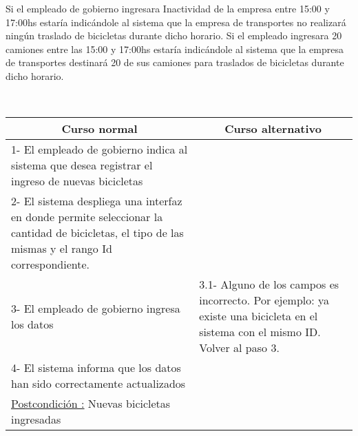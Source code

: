 Si el empleado de gobierno ingresara Inactividad de la empresa entre 15:00 y 17:00hs estaría indicándole al sistema que la empresa de transportes no realizará ningún
traslado de bicicletas durante dicho horario.
Si el empleado ingresara 20 camiones entre las 15:00 y 17:00hs estaría indicándole al sistema que la empresa de transportes destinará 20 de sus camiones para traslados
de bicicletas durante dicho horario.

~


\begin{center}
    \centering
    \begin{tabular}{ | p{11cm} | p{6cm} | }
    	\multicolumn{1}{c}{\cellcolor{black!30}\textbf{Curso normal}} & 
    	\multicolumn{1}{c}{\cellcolor{black!30}\textbf{Curso alternativo}} \\ \hline
    	1- El empleado de gobierno indica al sistema que desea registrar el ingreso de nuevas bicicletas & \\ \hline
    	2- El sistema despliega una interfaz en donde permite seleccionar la cantidad de bicicletas, el tipo de las mismas y el rango Id correspondiente.& \\ \hline
    	3- El empleado de gobierno ingresa los datos & 3.1-  Alguno de los campos es incorrecto. Por ejemplo:
        ya existe una bicicleta en el sistema con el mismo ID. Volver al paso 3. \\ \hline
    	4- El sistema informa que los datos han sido correctamente actualizados & \\ \hline
    	\underline{Postcondición :} Nuevas bicicletas ingresadas & \\ \hline
    \end{tabular}
\end{center}

~


